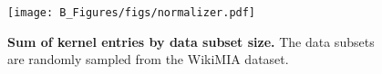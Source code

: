 
\begin{figure}[h]
    \vspace{2mm}
    \begin{center}
    \texttt{[image: B\_Figures/figs/normalizer.pdf]}
    \end{center}
    \vspace{-5mm}
    \caption{\textbf{Sum of kernel entries by data subset size.} The data subsets are randomly sampled from the WikiMIA dataset.}
\label{fig:normalizer}
\end{figure}
